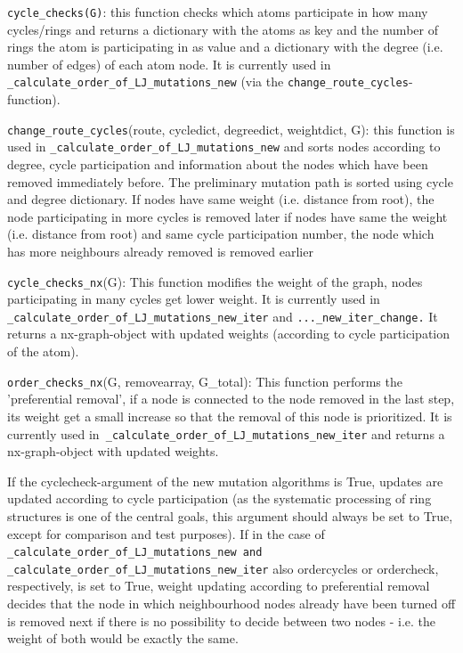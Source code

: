 \texttt{cycle\_checks(G)}: this function checks which atoms participate
in how many cycles/rings and returns a dictionary with the atoms as
key and the number of rings the atom is participating in as value
and a dictionary with the degree (i.e. number of edges) of each atom
node. It is currently used in \texttt{\_calculate\_order\_of\_LJ\_mutations\_new}
(via the \texttt{change\_route\_cycles}-function).

\texttt{change\_route\_cycles}(route, cycledict, degreedict, weightdict,
G): this function is used in \texttt{\_calculate\_order\_of\_LJ\_mutations\_new}
and sorts nodes according to degree, cycle participation and information
about the nodes which have been removed immediately before. The preliminary mutation
path is sorted using cycle and degree dictionary. If nodes have same
weight (i.e. distance from root), the node participating in more cycles
is removed later if nodes have same the weight (i.e. distance from root)
and same cycle participation number, the node which has more neighbours
already removed is removed earlier

\texttt{cycle\_checks\_nx}(G): This function modifies the weight of
the graph, nodes participating in many cycles get lower weight. It
is currently used in 
\texttt{\_calculate\_order\_of\_LJ\_mutations\_new\_iter} and \texttt{...\_new\_iter\_change.} It returns a nx-graph-object
with updated weights (according to cycle participation of the atom).

\texttt{order\_checks\_nx}(G, removearray, G\_total): This function
performs the 'preferential removal', if a node is connected to the
node removed in the last step, its weight get a small increase so
that the removal of this node is prioritized. It is currently used
in\texttt{ \_calculate\_order\_of\_LJ\_mutations\_new\_iter} and returns
a nx-graph-object with updated weights.

If the cyclecheck-argument of the new mutation algorithms is True,
updates are updated according to cycle participation (as the systematic
processing of ring structures is one of the central goals, this argument
should always be set to True, except for comparison and test purposes).
If in the case of \texttt{\_calculate\_order\_of\_LJ\_mutations\_new
and \_calculate\_order\_of\_LJ\_mutations\_new\_iter} also ordercycles
or ordercheck, respectively, is set to True, weight updating according
to preferential removal decides that the node in which neighbourhood
nodes already have been turned off is removed next if there is no
possibility to decide between two nodes - i.e. the weight of both
would be exactly the same.

